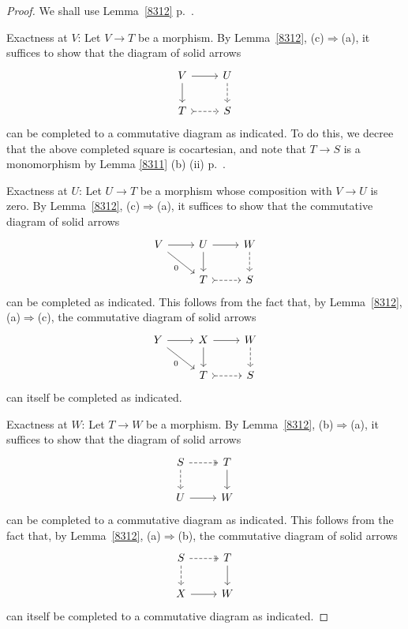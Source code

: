 \documentclass[12pt]{article}
\theoremstyle{remark}
\theoremstyle{definition}
\newcommand{\nn}{\noindent}
\newcommand{\then}{\Rightarrow}
\begin{document}
\begin{proof}
We shall use Lemma~\ref{8312} p.~\pageref{8312}.

\nn Exactness at $V$: Let $V\to T$ be a morphism. By Lemma~\ref{8312}, (c)$\then$(a), it suffices to show that the diagram of solid arrows 
$$
\begin{tikzcd}
V\ar{r}\ar{d}&U\ar[dashed]{d}\\ 
T\ar[dashed,tail]{r}&S
\end{tikzcd}
$$ 
can be completed to a commutative diagram as indicated. To do this, we decree that the above completed square is cocartesian, and note that $T\to S$ is a monomorphism by Lemma \ref{8311} (b) (ii) p.~\pageref{8311}.

\nn Exactness at $U$: Let $U\to T$ be a morphism whose composition with $V\to U$ is zero. By Lemma~\ref{8312}, (c)$\then$(a), it suffices to show that the commutative diagram of solid arrows 
$$
\begin{tikzcd}
V\ar{r}\ar{dr}[swap]{0}&U\ar{r}\ar{d}&W\ar[dashed]{d}\\ 
{}&T\ar[dashed,tail]{r}&S
\end{tikzcd}
$$ 
can be completed as indicated. This follows from the fact that, by Lemma~\ref{8312}, (a)$\then$(c), the commutative diagram of solid arrows 
$$
\begin{tikzcd}
Y\ar{r}\ar{dr}[swap]{0}&X\ar{r}\ar{d}&W\ar[dashed]{d}\\ 
{}&T\ar[dashed,tail]{r}&S
\end{tikzcd}
$$ 
can itself be completed as indicated.

\nn Exactness at $W$: Let $T\to W$ be a morphism. By Lemma~\ref{8312}, (b)$\then$(a), it suffices to show that the diagram of solid arrows 
$$
\begin{tikzcd}
S\ar[dashed,two heads]{r}\ar[dashed]{d}&T\ar{d}\\ 
U\ar{r}&W
\end{tikzcd}
$$ 
can be completed to a commutative diagram as indicated. This follows from the fact that, by Lemma~\ref{8312}, (a)$\then$(b), the commutative diagram of solid arrows 
$$
\begin{tikzcd}
S\ar[dashed,two heads]{r}\ar[dashed]{d}&T\ar{d}\\ 
X\ar{r}&W
\end{tikzcd}
$$ 
can itself be completed to a commutative diagram as indicated.
\end{proof}
\end{document}
